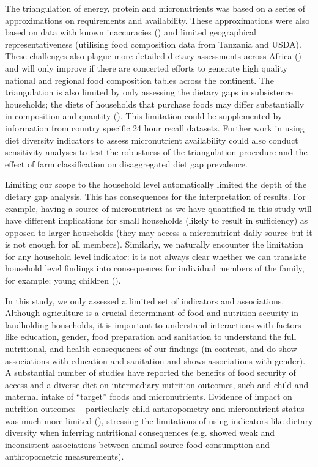 The triangulation of energy, protein and micronutrients was based on a series of approximations on requirements and availability. These approximations were also based on data with known inaccuracies (\citealp{Joy2014}) and limited geographical representativeness (utilising food composition data from Tanzania and USDA). These challenges also plague more detailed dietary assessments across Africa (\citealp{Vila-real2018}) and will only improve if there are concerted efforts to generate high quality national and regional food composition tables across the continent. The triangulation is also limited by only assessing the dietary gaps in subsistence households; the diets of households that purchase foods may differ substantially in composition and quantity (\citealp{Popkin2014}). This limitation could be supplemented by information from country specific 24 hour recall datasets. Further work in using diet diversity indicators to assess micronutrient availability could also conduct sensitivity analyses to test the robustness of the triangulation procedure and the effect of farm classification on disaggregated diet gap prevalence.

Limiting our scope to the household level automatically limited the depth of the dietary gap analysis. This has consequences for the interpretation of results. For example, having a source of micronutrient as we have quantified in this study will have different implications for small households (likely to result in sufficiency) as opposed to larger households (they may access a micronutrient daily source but it is not enough for all members). Similarly, we naturally encounter the limitation for any household level indicator: it is not always clear whether we can translate household level findings into consequences for individual members of the family, for example: young children (\citealp{Caraher2016}).

In this study, we only assessed a limited set of indicators and associations. Although agriculture is a crucial determinant of food and nutrition security in landholding households, it is important to understand interactions with factors like education, gender, food preparation and sanitation to understand the full nutritional, and health consequences of our findings (in contrast, \citealp{Godecke2018} and \citealp{Ramankutty2018} do show associations with education and sanitation and \citealp{Dzanku2019} shows associations with gender). A substantial number of studies have reported the benefits of food security of access and a diverse diet on intermediary nutrition outcomes, such and child and maternal intake of ``target'' foods and micronutrients. Evidence of impact on nutrition outcomes -- particularly child anthropometry and micronutrient status -- was much more limited (\citealp{Gillespie2017}), stressing the limitations of using indicators like dietary diversity when inferring nutritional consequences (e.g. \citealp{Hetherington2017} showed weak and inconsistent associations between animal-source food consumption and anthropometric measurements).

